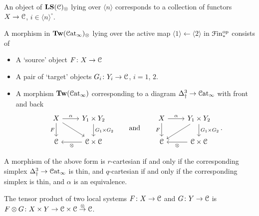 \documentclass[main.tex]{subfiles}
\begin{document}
\begin{example}
  An object of $\mathbf{LS}(\mathcal{C})_{\otimes}$ lying over $\langle n \rangle$ corresponds to a collection of functors $X \to \mathcal{C}$, $i \in \langle n \rangle^{\circ}$.
\end{example}

\begin{example}
  A morphism in $\mathbf{Tw}(\mathcal{C}\mathrm{at}_{\infty})_{\otimes}$ lying over the active map $\langle 1 \rangle \leftarrow \langle 2 \rangle$ in $\mathcal{F}\mathrm{in}_{*}^{\mathrm{op}}$ consists of
  \begin{itemize}
    \item A `source' object $F\colon X \to \mathcal{C}$

    \item A pair of `target' objects $G_{i}\colon Y_{i} \to \mathcal{C}$, $i = 1$, $2$.

    \item A morphism $\mathbf{Tw}(\mathcal{C}\mathrm{at}_{\infty})$ corresponding to a diagram $\Delta^{3}_{\dagger} \to \mathcal{C}\mathrm{at}_{\infty}$ with front and back
      \begin{equation*}
        \begin{tikzcd}
          X
          \arrow[r, "\alpha"]
          \arrow[d, ""{name=L, right}, "F"{left}]
          \arrow[dr]
          & Y_{1} \times Y_{2}
          \arrow[d, ""{name=R, left}, "G_{1} \times G_{2}"{right}]
          \\
          \category{C}
          & \category{C} \times \category{C}
          \arrow[l, "\otimes"]
        \end{tikzcd}
        \qquad\text{and}\qquad
        \begin{tikzcd}
          X
          \arrow[r, "\alpha"]
          \arrow[d, ""{name=L, right}, "F"{left}]
          & Y_{1} \times Y_{2}
          \arrow[d, ""{name=R, left}, "G_{1} \times G_{2}"{right}]
          \arrow[dl]
          \\
          \category{C}
          & \category{C} \times \category{C}
          \arrow[l, "\otimes"]
        \end{tikzcd}.
      \end{equation*}
  \end{itemize}

  A morphism of the above form is $r$-cartesian if and only if the corresponding simplex $\Delta^{3}_{\dagger} \to \mathcal{C}\mathrm{at}_{\infty}$ is thin, and $q$-cartesian if and only if the corresponding simplex is thin, and $\alpha$ is an equivalence.
\end{example}

\begin{example}
  The tensor product of two local systems $F\colon X \to \mathcal{C}$ and $G\colon Y \to \mathcal{C}$ is $F \otimes G\colon X \times Y \to \mathcal{C} \times \mathcal{C} \overset{\otimes}{\to} \mathcal{C}$.
\end{example}
\end{document}
